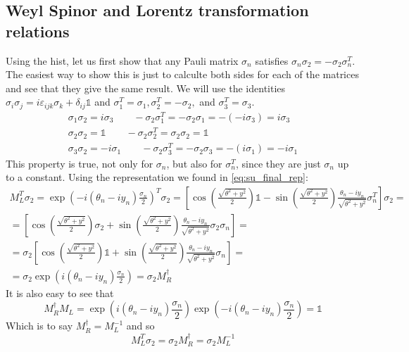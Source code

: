 \documentclass{article}
\begin{document}
\subsection{Weyl Spinor and Lorentz transformation relations}
Using the hist, let us first show that any Pauli matrix $\sigma_n$ satisfies $\sigma_n\sigma_2 = -\sigma_2\sigma_n^T$. The easiest way to show this is just to calculte both sides for each of the matrices and see that they give the same result. We will use the identities $\sigma_i\sigma_j = i\varepsilon_{ijk}\sigma_k + \delta_{ij}\mathbb{1}$ and $\sigma_1^T = \sigma_1, \sigma_2^T = -\sigma_2,$ and $\sigma_3^T = \sigma_3$.
\begin{equation}
\begin{gathered}
    \sigma_1\sigma_2 = i\sigma_3 \qquad -\sigma_2\sigma_1^T = -\sigma_2\sigma_1 = -(-i\sigma_3) = i\sigma_3
    \\
    \sigma_2\sigma_2 = \mathbb{1} \qquad -\sigma_2\sigma_2^T = \sigma_2\sigma_2 = \mathbb{1}
    \\
    \sigma_3\sigma_2 = -i\sigma_1 \qquad -\sigma_2\sigma_3^T = -\sigma_2\sigma_3 = -(i\sigma_1) = -i\sigma_1
\end{gathered}
\end{equation}
This property is true, not only for $\sigma_n$, but also for $\sigma_n^T$, since they are just $\sigma_n$ up to a constant.
\newline
Using the representation we found in \ref{eq:su_final_rep}:
\begin{equation}
\begin{gathered}
    M_L^{T}\sigma_2 = \exp(-i\left(\theta_n - iy_n\right)\frac{\sigma_n}{2})^T\sigma_2 =
    \left[\cos(\frac{\sqrt{\theta^2 + y^2}}{2})\mathbb{1} - \sin(\frac{\sqrt{\theta^2 + y^2}}{2}) \frac{\theta_n - iy_n}{\sqrt{\theta^2 + y^2}}\sigma_n^T\right]\sigma_2
    = \\ =
    \left[\cos(\frac{\sqrt{\theta^2 + y^2}}{2})\sigma_2 + \sin(\frac{\sqrt{\theta^2 + y^2}}{2}) \frac{\theta_n - iy_n}{\sqrt{\theta^2 + y^2}}\sigma_2\sigma_n\right]
    = \\ =
    \sigma_2\left[\cos(\frac{\sqrt{\theta^2 + y^2}}{2})\mathbb{1} + \sin(\frac{\sqrt{\theta^2 + y^2}}{2}) \frac{\theta_n - iy_n}{\sqrt{\theta^2 + y^2}}\sigma_n\right]
    = \\ =
    \sigma_2\exp(i\left(\theta_n - iy_n\right)\frac{\sigma_n}{2})
    = \sigma_2M_R^\dagger
\end{gathered}
\end{equation}
It is also easy to see that
\begin{equation}
    M_R^\dagger M_L = \exp(i\left(\theta_n - iy_n\right)\frac{\sigma_n}{2})\exp(-i\left(\theta_n - iy_n\right)\frac{\sigma_n}{2}) = \mathbb{1}
\end{equation}
Which is to say $M_R^\dagger = M_L^{-1}$ and so
\begin{equation}
    M_L^T\sigma_2 = \sigma_2M_R^\dagger = \sigma_2M_L^{-1}
\end{equation}
\end{document}
